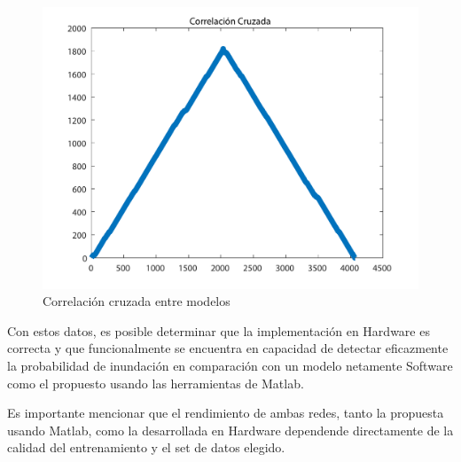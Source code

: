 \begin{figure}[H]
	\centering
		\includegraphics[scale=0.6]{./Figures/xcorrANN}
	\caption{Correlación cruzada entre modelos}
	\label{fig:xcorr}
\end{figure}

Con estos datos, es posible determinar que la implementación en Hardware es correcta y que funcionalmente se encuentra en capacidad de detectar eficazmente la probabilidad de inundación en comparación con un modelo netamente Software como el propuesto usando las herramientas de Matlab.

Es importante mencionar que el rendimiento de ambas redes, tanto la propuesta usando Matlab, como la desarrollada en Hardware dependende directamente de la calidad del entrenamiento y el set de datos elegido.
